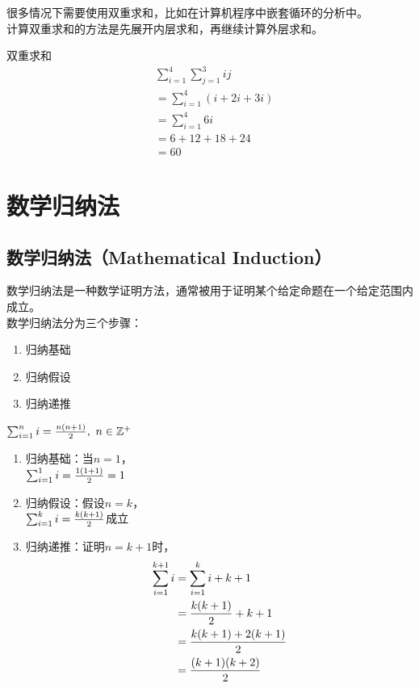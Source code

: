 \documentclass[12pt, openany, oneside]{book}
\begin{document}
很多情况下需要使用双重求和，比如在计算机程序中嵌套循环的分析中。 \\

计算双重求和的方法是先展开内层求和，再继续计算外层求和。

\begin{tcolorbox}\nonumber
	双重求和
	\begin{align}
		 & \sum_{i=1}^{4} \sum_{j=1}^{3} ij \\
		 & = \sum_{i=1}^{4} (i + 2i + 3i)   \\
		 & = \sum_{i=1}^{4} 6i              \\
		 & = 6 + 12 + 1 8 + 24              \\
		 & = 60
	\end{align}
\end{tcolorbox}

\newpage

\section{数学归纳法}

\subsection{数学归纳法（Mathematical Induction）}

数学归纳法是一种数学证明方法，通常被用于证明某个给定命题在一个给定范围内成立。 \\

数学归纳法分为三个步骤：

\begin{enumerate}
	\item 归纳基础
	\item 归纳假设
	\item 归纳递推
\end{enumerate}

\begin{tcolorbox}\nonumber
	$ \sum_{i=1}^{n} i = {n(n+1) \over 2},\ n \in \mathbb{Z^+} $
	\begin{enumerate}
		\item 归纳基础：当$ n = 1 $，\\
		      $ \sum_{i=1}^{1} i = {1(1+1) \over 2} = 1 $

		\item 归纳假设：假设$ n = k $， \\
		      $ \sum_{i=1}^{k} i = {k(k+1) \over 2} $成立

		\item 归纳递推：证明$ n = k + 1 $时，
		      \begin{align}
			      \sum_{i=1}^{k+1} i & = \sum_{i=1}^{k} i + k + 1  \\
			                         & = {k(k+1) \over 2} + k + 1  \\
			                         & = {k(k+1) + 2(k+1) \over 2} \\
			                         & = {(k+1)(k+2) \over 2}
		      \end{align}
	\end{enumerate}
\end{tcolorbox}
\end{document}
